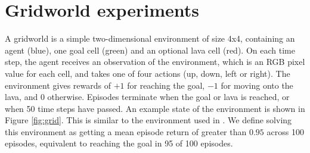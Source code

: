 \documentclass[11pt, a4paper, bibliography=totoc]{report}
\begin{document}
\section{Gridworld experiments}
A gridworld is a simple two-dimensional environment of size 4x4, containing an agent (blue), one goal cell (green) and an optional lava cell (red). On each time step, the agent receives an observation of the environment, which is an RGB pixel value for each cell, and takes one of four actions (up, down, left or right). The environment gives rewards of $ +1 $ for reaching the goal, $ -1 $ for moving onto the lava, and $ 0 $ otherwise. Episodes terminate when the goal or lava is reached, or when 50 time steps have passed. An example state of the environment is shown in Figure \ref{fig:grid}. This is similar to the environment used in \cite{kenton2019generalizing}. We define solving this environment as getting a mean episode return of greater than $ 0.95 $ across 100 episodes, equivalent to reaching the goal in 95 of 100 episodes.
\end{document}
